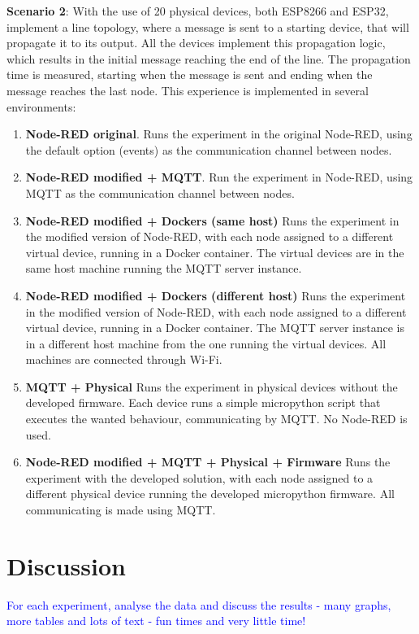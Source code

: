 \textbf{Scenario 2}:
With the use of 20 physical devices, both ESP8266 and ESP32, implement a line topology, where a message is sent to a starting device, that will propagate it to its output. All the devices implement this propagation logic, which results in the initial message reaching the end of the line. The propagation time is measured, starting when the message is sent and ending when the message reaches the last node.
This experience is implemented in several environments:
\begin{enumerate}
    \item \textbf{Node-RED original}. Runs the experiment in the original Node-RED, using the default option (events) as the communication channel between nodes.
    \item \textbf{Node-RED modified + MQTT}. Run the experiment in Node-RED, using MQTT as the communication channel between nodes.
    \item \textbf{Node-RED modified + Dockers (same host)} Runs the experiment in the modified version of Node-RED, with each node assigned to a different virtual device, running in a Docker container. The virtual devices are in the same host machine running the MQTT server instance.
    \item \textbf{Node-RED modified + Dockers (different host)} Runs the experiment in the modified version of Node-RED, with each node assigned to a different virtual device, running in a Docker container. The MQTT server instance is in a different host machine from the one running the virtual devices. All machines are connected through Wi-Fi.
    \item \textbf{MQTT + Physical} Runs the experiment in physical devices without the developed firmware. Each device runs a simple micropython script that executes the wanted behaviour, communicating by MQTT. No Node-RED is used.
    \item \textbf{Node-RED modified + MQTT + Physical + Firmware} Runs the experiment with the developed solution, with each node assigned to a different physical device running the developed micropython firmware. All communicating is made using MQTT.
\end{enumerate}

\section{Discussion}\label{sec:evaluation_discussion}

\textcolor{blue}{For each experiment, analyse the data and discuss the results - many graphs, more tables and lots of text - fun times and very little time!}

